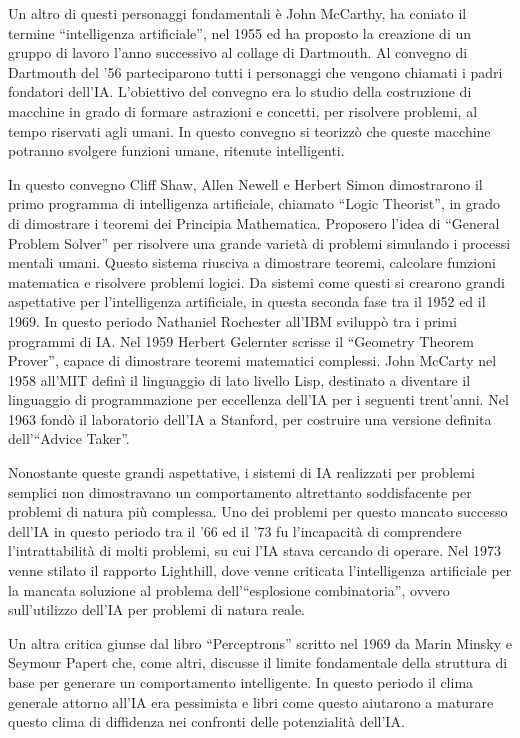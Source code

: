 \documentclass{article}
\numberwithin{equation}{subsection}
\begin{document}
Un altro di questi personaggi fondamentali è John McCarthy, ha coniato il termine ``intelligenza artificiale'', 
nel 1955 ed ha proposto la creazione di un gruppo di lavoro l'anno successivo al collage di Dartmouth. 
Al convegno di Dartmouth del '56  parteciparono 
tutti i personaggi che vengono chiamati i padri fondatori dell'IA. 
L'obiettivo del convegno era lo studio della costruzione di macchine in grado di 
formare astrazioni e concetti, per risolvere problemi, al tempo riservati agli umani. 
In questo convegno si teorizzò che queste macchine potranno svolgere funzioni umane, 
ritenute intelligenti. 

In questo convegno Cliff Shaw, Allen Newell e Herbert Simon dimostrarono il primo 
programma di intelligenza artificiale, chiamato ``Logic Theorist'', in grado di dimostrare 
i teoremi dei Principia Mathematica. 
Proposero l'idea di ``General Problem Solver'' per risolvere una grande varietà di problemi 
simulando i processi mentali umani. 
Questo sistema riusciva a dimostrare teoremi, calcolare funzioni matematica e risolvere 
problemi logici. Da sistemi come questi si crearono grandi aspettative per l'intelligenza 
artificiale, in questa seconda fase tra il 1952 ed il 1969. 
In questo periodo Nathaniel Rochester all'IBM sviluppò tra i primi programmi di IA. 
Nel 1959 Herbert Gelernter scrisse il ``Geometry Theorem Prover'', capace di dimostrare 
teoremi matematici complessi. 
John McCarty nel 1958 all'MIT definì il linguaggio di lato livello Lisp, destinato 
a diventare il linguaggio di programmazione per eccellenza dell'IA per i seguenti trent'anni. 
Nel 1963 fondò il laboratorio dell'IA a Stanford, per costruire una versione 
definita dell'``Advice Taker''. 


Nonostante queste grandi aspettative, i sistemi di IA realizzati per problemi semplici 
non dimostravano un comportamento altrettanto soddisfacente per problemi di natura 
più complessa. 
Uno dei problemi per questo mancato successo dell'IA in questo periodo tra il '66 ed il '73 fu 
l'incapacità di comprendere l'intrattabilità di molti problemi, su cui l'IA stava cercando 
di operare. 
Nel 1973 venne stilato il rapporto Lighthill, dove venne criticata l'intelligenza artificiale 
per la mancata soluzione al problema dell'``esplosione combinatoria'', ovvero sull'utilizzo 
dell'IA per problemi di natura reale. 

Un altra critica giunse dal libro ``Perceptrons'' scritto nel 1969 da Marin Minsky e Seymour Papert 
che, come altri, discusse il limite fondamentale della struttura di base per generare un 
comportamento intelligente. In questo periodo il clima generale attorno all'IA era pessimista 
e libri come questo aiutarono a maturare questo clima di diffidenza nei confronti delle 
potenzialità dell'IA. 
\end{document}
